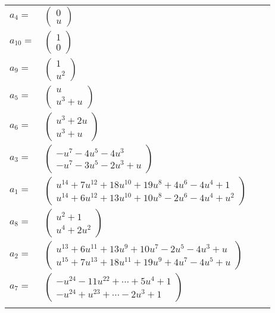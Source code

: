 \documentclass[1p]{elsarticle_modified}
\theoremstyle{definition}
\begin{document}
\begin{tabular}{m{7pt} m{180pt} m{7pt} m{180pt} }
\flushright $a_{4}=$&$\begin{pmatrix}0\\u\end{pmatrix}$ \\
\flushright $a_{10}=$&$\begin{pmatrix}1\\0\end{pmatrix}$ \\
\flushright $a_{9}=$&$\begin{pmatrix}1\\u^2\end{pmatrix}$ \\
\flushright $a_{5}=$&$\begin{pmatrix}u\\u^3+u\end{pmatrix}$ \\
\flushright $a_{6}=$&$\begin{pmatrix}u^3+2 u\\u^3+u\end{pmatrix}$ \\
\flushright $a_{3}=$&$\begin{pmatrix}- u^7-4 u^5-4 u^3\\- u^7-3 u^5-2 u^3+u\end{pmatrix}$ \\
\flushright $a_{1}=$&$\begin{pmatrix}u^{14}+7 u^{12}+18 u^{10}+19 u^8+4 u^6-4 u^4+1\\u^{14}+6 u^{12}+13 u^{10}+10 u^8-2 u^6-4 u^4+u^2\end{pmatrix}$ \\
\flushright $a_{8}=$&$\begin{pmatrix}u^2+1\\u^4+2 u^2\end{pmatrix}$ \\
\flushright $a_{2}=$&$\begin{pmatrix}u^{13}+6 u^{11}+13 u^9+10 u^7-2 u^5-4 u^3+u\\u^{15}+7 u^{13}+18 u^{11}+19 u^9+4 u^7-4 u^5+u\end{pmatrix}$ \\
\flushright $a_{7}=$&$\begin{pmatrix}- u^{24}-11 u^{22}+\cdots+5 u^4+1\\- u^{24}+u^{23}+\cdots-2 u^3+1\end{pmatrix}$\\&\end{tabular}
\end{document}

